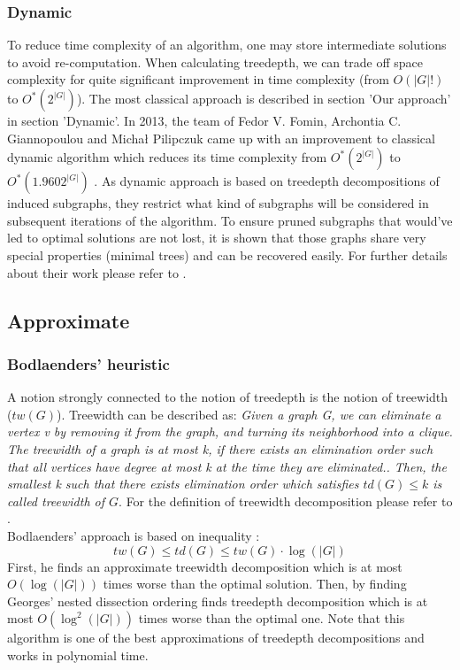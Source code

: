 \subsubsection{Dynamic}
To reduce time complexity of an algorithm, one may store intermediate solutions to avoid re-computation. When calculating treedepth, we can trade off space complexity for quite significant improvement in time complexity (from $O\left(\left|G\right|!\right)$ to $O^{*}\left(2^{\left|G\right|}\right)$). The most classical approach is described in section 'Our approach' in section 'Dynamic'. In 2013, the team of Fedor V. Fomin, Archontia C. Giannopoulou and Michał Pilipczuk came up with an improvement to classical dynamic algorithm which reduces its time complexity from $O^{*}\left(2^{\left|G\right|}\right)$ to $O^{*}\left(1.9602^{\left|G\right|}\right)$ \cite{mimuw_td}. As dynamic approach is based on treedepth decompositions of induced subgraphs, they restrict what kind of subgraphs will be considered in subsequent iterations of the algorithm. To ensure pruned subgraphs that would've led to optimal solutions are not lost, it is shown that those graphs share very special properties (minimal trees) and can be recovered easily. For further details about their work please refer to \cite{mimuw_td}.
\newpage
\subsection{Approximate}
\subsubsection{Bodlaenders' heuristic \cite{bodlaender_td_approx}}
A notion strongly connected to the notion of treedepth is the notion of treewidth ($tw\left(G\right)$). Treewidth can be described as:
\emph{Given a graph G, we can eliminate a vertex v by removing it from the graph, and turning its neighborhood into a clique. The treewidth of a graph is at most k, if there exists an elimination order such that all vertices have degree at most k at the time they are eliminated.\cite{tw_gpu}. Then, the smallest k such that there exists elimination order which satisfies $td(G)\leq k$ is called treewidth of $G$}. For the definition of treewidth decomposition please refer to \cite{tw_decomp}.\\
Bodlaenders' approach is based on inequality \cite{mimuw_td}\cite{bodlaender_td_approx}:
\begin{equation}
tw(G) \leq td(G) \leq tw(G)\cdot \log\left(\left|G\right|\right)
\end{equation}
First, he finds an approximate treewidth decomposition which is at most $O\left(\log\left(\left|G\right|\right)\right)$ times worse than the optimal solution.
Then, by finding Georges' nested dissection ordering \cite{george}\cite{bodlaender_td_approx} finds treedepth decomposition which is at most $O\left(\log^2\left(\left|G\right|\right)\right)$ times worse than the optimal one. Note that this algorithm is one of the best approximations of treedepth decompositions and works in polynomial time.
